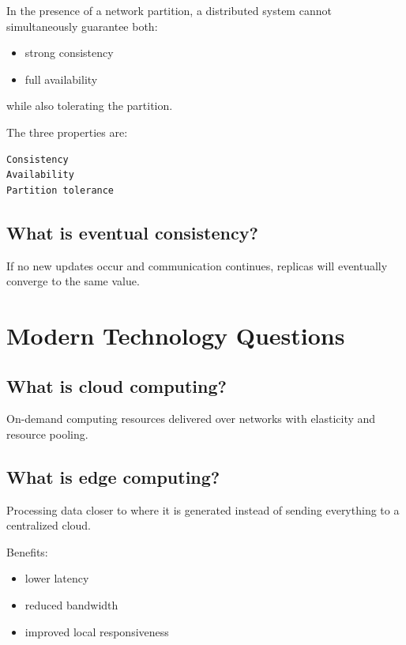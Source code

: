 In the presence of a network partition, a distributed system cannot simultaneously guarantee both:

\begin{itemize}
  \item strong consistency
  \item full availability
\end{itemize}

while also tolerating the partition.

The three properties are:

\begin{lstlisting}
Consistency
Availability
Partition tolerance
\end{lstlisting}

\medskip

\subsection{What is eventual consistency?}

If no new updates occur and communication continues, replicas will eventually converge to the same value.

\medskip

\section{Modern Technology Questions}

\subsection{What is cloud computing?}

On-demand computing resources delivered over networks with elasticity and resource pooling.

\medskip

\subsection{What is edge computing?}

Processing data closer to where it is generated instead of sending everything to a centralized cloud.

Benefits:

\begin{itemize}
  \item lower latency
  \item reduced bandwidth
  \item improved local responsiveness
\end{itemize}

